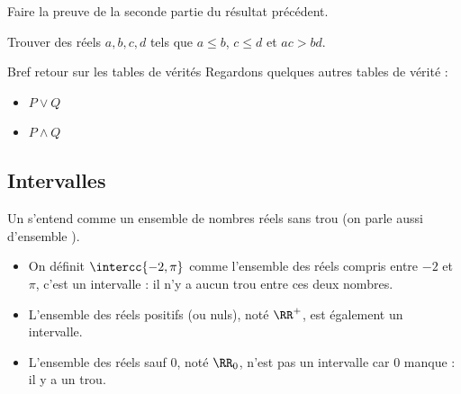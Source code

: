\documentclass[french,xcolor=svgnames]{beamer}
\begin{document}
\begin{frame}
  \begin{exercise}
    Faire la preuve de la seconde partie du résultat précédent.%
  \end{exercise}
  \begin{exercise}
    Trouver des réels \(a,b,c,d\) tels que \(a \leq b\), \(c \leq d\) et \(ac > bd\).
  \end{exercise}
\end{frame}

\begin{frame}{Bref retour sur les tables de vérités}
  Regardons quelques autres tables de vérité :\pause{}
  \begin{itemize}
  \item $P \lor Q$
  \item $P \land Q$
  \end{itemize}
\end{frame}

\subsection{Intervalles}
\begin{frame}
  \begin{definition}
    Un  s'entend comme un ensemble de nombres réels \og sans trou\fg{}\pause{} (on parle aussi d'ensemble ).\pause{}
  \end{definition}

  \begin{example}
    \begin{itemize}
    \item On définit $\intercc{-2,\pi}$ comme l'ensemble des réels compris entre $-2$ et $\pi$, c'est un intervalle : il n'y a aucun trou entre ces deux nombres.\pause{}
    \item L'ensemble des réels positifs (ou nuls),\pause{} noté \(\RR^+\),\pause{} est également un intervalle.\pause{}
    \item L'ensemble des réels sauf \(0\),\pause{} noté \(\RR_0\),\pause{} n'est pas un intervalle car \(0\) manque : il y a un trou.\pause{}
    \end{itemize}
  \end{example}
\end{frame}
\end{document}
